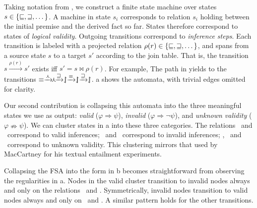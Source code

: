 Taking notation from , we construct a
  finite state machine over states
  $s \in \{\textrm{\small{\forward}}, \textrm{\small{\reverse}}, \dots \}$.
A machine in state $s_i$ corresponds to relation $s_i$
  holding between the initial premise and the derived fact so far.
States therefore correspond to states of \textit{logical validity}.
Outgoing transitions correspond to \textit{inference steps}.
Each transition is labeled with a projected relation
  $\rho(r) \in \{\textrm{\small{\forward}}, \textrm{\small{\reverse}}, \dots\}$,
  and spans from a source
  state $s$ to a target $s'$ according to the join table.
That is, the transition $s \xrightarrow{\rho(r)} s'$ exists iff
  $s' = s \bowtie \rho(r)$.
For example, The path in  yields to the
  transitions 
  $\equivalent \xrightarrow{\negate} \hspace{-0.5em} \negate \hspace{-0.5em}
               \xrightarrow{\reverse} \alternate
               \xrightarrow{\equivalent} \alternate
               \xrightarrow{\reverse} \alternate$.
a shows the automata, with trivial edges
  omitted for clarity.

Our second contribution is collapsing this automata into the three
  meaningful states we use as output: 
    \textit{valid} ($\varphi \Rightarrow \psi$),
    \textit{invalid} ($\varphi \Rightarrow \lnot \psi$),
  and \textit{unknown validity} ($\varphi \nRightarrow \psi$).
We can cluster states in a into these three categories.
The relations \equivalent\ and \forward\ correspond to valid inferences;
  \negate\ and \alternate\ correspond to invalid inferences;
  \reverse, \cover\ and \independent\ correspond to unknown validity.
This clustering mirrors that used by MacCartney for his textual
  entailment experiments.

Collapsing the FSA into the form in b becomes straightforward
  from observing the regularities in a.
Nodes in the valid cluster transition to invalid nodes
  always and only on the relations \negate\ and \alternate.
Symmetrically, invalid nodes transition to valid nodes always and only
  on \negate\ and \cover.
A similar pattern holds for the other transitions.

